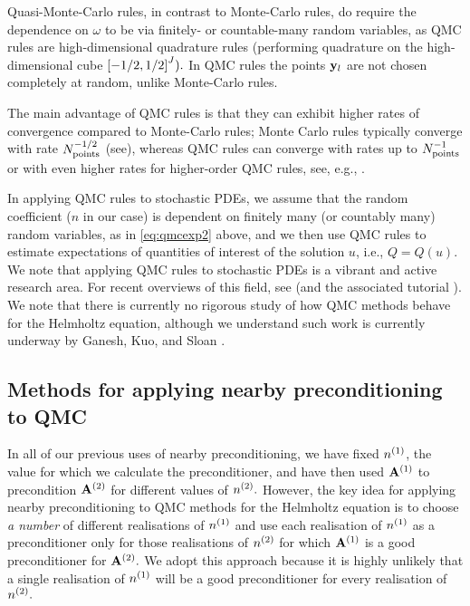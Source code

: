 Quasi-Monte-Carlo rules, in contrast to Monte-Carlo rules, do require the dependence on $\omega$ to be via finitely- or countable-many random variables, as QMC rules are high-dimensional quadrature rules (performing quadrature on the high-dimensional cube $\cube{J}).$ In QMC rules the points $\mathbf{y}_{l}$ are not chosen completely at random, unlike Monte-Carlo rules.

The main advantage of QMC rules is that they can exhibit higher rates of convergence compared to Monte-Carlo rules; Monte Carlo rules typically converge with rate $N_{\mathrm{points}}^{-1/2}$ (see), whereas QMC rules can converge with rates up to $N_{\mathrm{points}}^{-1}$  or with even higher rates for higher-order QMC rules, see, e.g., \cite[Penultimate paragraph of Section 1.2]{KuNu:16}.

In applying QMC rules to stochastic PDEs, we assume that the random coefficient ($n$ in our case) is dependent on finitely many (or countably many) random variables, as in \cref{eq:qmcexp2} above, and we then use QMC rules to estimate expectations of quantities of interest of the solution $u$, i.e., $Q = Q(u).$ We note that applying QMC rules to stochastic PDEs is a vibrant and active research area. For recent overviews of this field, see \cite{KuNu:16,KuNu:18b} (and the associated tutorial \cite{KuNu:18a}). We note that there is currently no rigorous study of how QMC methods behave for the Helmholtz equation, although we understand such work is currently underway by Ganesh, Kuo, and Sloan \cite{GaKuSl}.

\subsection{Methods for applying nearby preconditioning to QMC}\label{sec:nbpcqmcnum}
In all of our previous uses of nearby preconditioning, we have fixed ${n}^{(1)}$, the value for which we calculate the preconditioner, and have then used $\mathbf{A}^{(1)}$ to precondition $\mathbf{A}^{(2)}$ for different values of ${n}^{(2)}.$ However, the key idea for applying nearby preconditioning to QMC methods for the Helmholtz equation is to choose \emph{a number} of different realisations of ${n}^{(1)}$ and use each realisation of ${n}^{(1)}$ as a preconditioner only for those  realisations of ${n}^{(2)}$ for which $\mathbf{A}^{(1)}$ is a good preconditioner for $\mathbf{A}^{(2)}.$ We adopt this approach because it is highly unlikely that a single realisation of ${n}^{(1)}$ will be a good preconditioner for every realisation of ${n}^{(2)}.$

